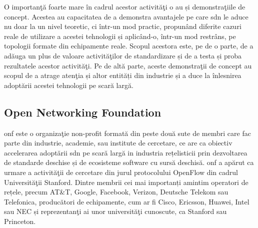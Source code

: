 O importanţă foarte mare în cadrul acestor activităţi o au și demonstraţiile de concept. Acestea au capacitatea de a demonstra avantajele pe care \gls{sdn} le aduce nu doar la un nivel teoretic, ci într-un mod practic, propunând diferite cazuri reale de utilizare a acestei tehnologii și aplicând-o, într-un mod restrâns, pe topologii formate din echipamente reale. Scopul acestora este, pe de o parte, de a adăuga un plus de valoare activităţilor de standardizare și de a testa și proba rezultatele acestor activităţi. Pe de altă parte, aceste demonstraţii de concept au scopul de a atrage atenţia și altor entități din industrie și a duce la înlesnirea adoptării acestei tehnologii pe scară largă.

\subsection{Open Networking Foundation}

\gls{onf} este o organizaţie non-profit formată din peste două sute de membri care fac parte din industrie, academie, sau institute de cercetare, ce are ca obiectiv accelerarea adoptării \gls{sdn} pe scară largă in industria rețelisticii prin dezvoltarea de standarde deschise și de ecosisteme software cu sursă deschisă. \gls{onf} a apărut ca urmare a activităţii de cercetare din jurul protocolului OpenFlow din cadrul Universităţii Stanford. Dintre membrii cei mai importanți amintim operatori de rețele, precum AT\&T, Google, Facebook, Verizon, Deutsche Telekom sau Telefonica, producători de echipamente, cum ar fi Cisco, Ericsson, Huawei, Intel sau NEC și reprezentanţi ai unor universităţi cunoscute, ca Stanford sau Princeton.


